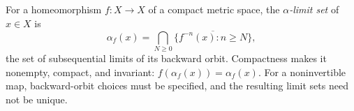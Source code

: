 
For a homeomorphism $f:X\to X$ of a compact metric space, the \emph{$\alpha$-limit set} of $x\in X$ is
\[
\alpha_f(x)=\bigcap_{N\ge0}\overline{\{f^{-n}(x):n\ge N\}},
\]
the set of subsequential limits of its backward orbit. Compactness makes it nonempty, compact, and invariant: $f(\alpha_f(x))=\alpha_f(x)$. For a noninvertible map, backward-orbit choices must be specified, and the resulting limit sets need not be unique.
